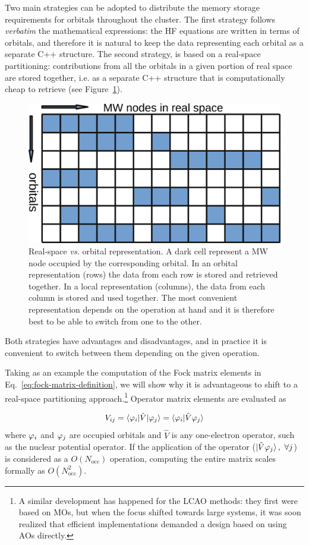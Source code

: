 \documentclass[journal=jctcce, manuscript=article]{achemso}
\begin{document}
Two main strategies can be adopted to distribute the memory storage requirements for orbitals throughout the cluster. The first strategy follows \emph{verbatim} the mathematical expressions: the \ac{HF} equations are written in terms of orbitals, and therefore it is natural to keep the data representing each orbital as a separate C++ structure. The second strategy, is based on a real-space partitioning: contributions from all the orbitals in a given portion of real space are stored together, i.e. as a separate C++ structure that is computationally cheap to retrieve (see Figure~\ref{fig01}). 
\begin{figure}[htb]
\centering
\includegraphics[width=.6\textwidth]{checkerboard.png}
\caption{Real-space \emph{vs.} orbital representation. A dark cell represent a \ac{MW} node occupied by the corresponding orbital. In an orbital representation (rows) the data from each row is stored and retrieved together. In a local representation (columns), the data from each column is stored and used together. The most convenient representation depends on the operation at hand and it is therefore best to be able to switch from one to the other.}
\label{fig01}
\end{figure}
Both strategies have advantages and disadvantages, and in practice it is convenient to switch between them depending on the given operation.

Taking as an example the computation of the Fock matrix elements in Eq.~\eqref{eq:fock-matrix-definition},  we will show why it is advantageous to shift to a real-space partitioning approach.\footnote{A similar development has happened for the \ac{LCAO} methods: they first were based on \acp{MO}, but when the focus shifted towards large systems, it was soon realized that efficient implementations demanded a design based on using \acp{AO} directly.\cite{Helgaker2000-yb}}
Operator matrix elements are evaluated as 

\begin{equation}
  V_{ij} = \braket{\varphi_{i} | {\hat V} |\varphi_j}  = \braket{\varphi_i | {\hat V} \varphi_j} 
\end{equation}
where $\varphi_i$ and $\varphi_j$ are occupied orbitals and ${\hat V}$ is any one-electron operator, such as the nuclear potential operator. If the application of the operator ($\ket{{\hat V} \varphi_j},\,\,\forall j$) is considered as a $O(N_{\mathrm{occ}})$
operation, computing the entire matrix scales formally as $O(N_{\mathrm{occ}}^2)$. 
\end{document}
